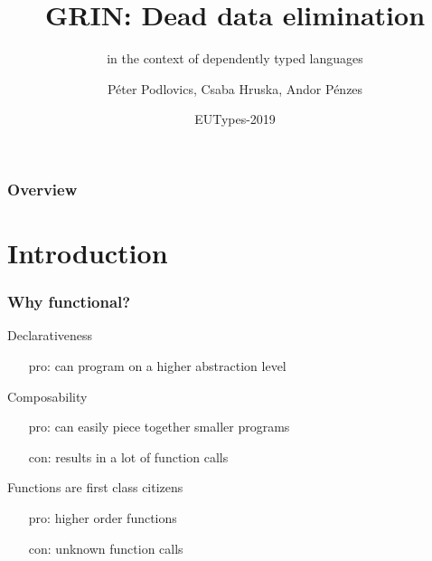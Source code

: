\documentclass[bigger]{beamer}
\title[GRIN] %
{GRIN: Dead data elimination}
\subtitle{in the context of dependently typed languages}
\author[P. Podlovics, Cs. Hruska ] %
{Péter Podlovics, Csaba Hruska, Andor Pénzes}
\institute[ELTE] %
{
	Eötvös Loránd University (ELTE), \\ Budapest, Hungary
}
\date{EUTypes-2019} %
\begin{document}
	
{
	\frame{\vspace{15mm}\titlepage}
}

\begin{frame}
	\frametitle{Overview}
	\tableofcontents
\end{frame}


\section{Introduction}

\begin{frame}[fragile]
	\frametitle{Why functional?}
	
	\begin{vfitemize}
		\item Declarativeness
			\begin{itemize}
				\item[pro:] can program on a higher abstraction level
			\end{itemize}
		\item Composability\\
			\begin{itemize}
				\item[pro:] can easily piece together smaller programs
				\item[con:] results in a lot of function calls
			\end{itemize}
		\item Functions are first class citizens
			\begin{itemize}
				\item[pro:] higher order functions
				\item[con:] unknown function calls
			\end{itemize}
	\end{vfitemize}

\end{frame}
\end{document}
